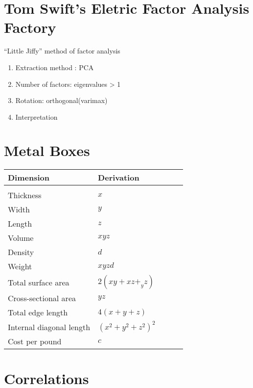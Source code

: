 \documentclass[
]{book}
\providecommand{\tightlist}{%
  \setlength{\itemsep}{0pt}\setlength{\parskip}{0pt}}
\begin{document}
\hypertarget{tom-swifts-eletric-factor-analysis-factory}{%
\section{Tom Swift's Eletric Factor Analysis Factory}\label{tom-swifts-eletric-factor-analysis-factory}}

``Little Jiffy'' method of factor analysis

\begin{enumerate}
\def\labelenumi{\arabic{enumi}.}
\tightlist
\item
  Extraction method : PCA
\item
  Number of factors: eigenvalues \textgreater{} 1
\item
  Rotation: orthogonal(varimax)
\item
  Interpretation
\end{enumerate}

\hypertarget{metal-boxes}{%
\section{Metal Boxes}\label{metal-boxes}}

\begin{table}[]
\begin{tabular}{lllll}
 Dimension &  Derivation  &  \\
 \hline \\
 Thickness &  $x$  \\
 Width & $y$ \\
 Length & $z$ \\
 Volume & $xyz$ \\
 Density & $d$ \\
 Weight & $xyzd$ \\
 Total surface area & $2(xy + xz +_ yz)$ \\
 Cross-sectional area & $yz$ \\
 Total edge length & $4(x +  y + z)$ \\
 Internal diagonal length & $(x^2 + y^2 + z^2)^2$ \\
 Cost per pound & $c$
\end{tabular}
\end{table}

\hypertarget{correlations}{%
\section{Correlations}\label{correlations}}
\end{document}
